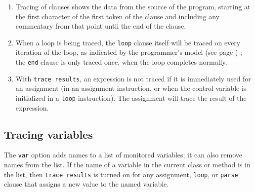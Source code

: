 \begin{enumerate}
\item Tracing of clauses shows the data from the source of the program,
starting at the first character of the first token of the clause and
including any commentary from that point until the end of the clause.
\item When a loop is being traced, the \texttt{loop} clause itself will be
traced on every iteration of the loop, as indicated by the
 programmer's model (see page \pageref{refloopmod}) ; the \texttt{end} clause is only
traced once, when the loop completes normally.
\item With \texttt{trace results}, an expression is not traced if it is
immediately used for an assignment (in an assignment instruction, or
when the control variable is initialized in a \texttt{loop}
instruction).
The assignment will trace the result of the expression.
\end{enumerate}
\subsection{Tracing variables}
 
The \texttt{var} option adds names to a list of monitored
variables; it can also remove names from the list.  If the name of a
variable in the current class or method is in the list, then \texttt{trace
results} is turned on for any assignment, \texttt{loop}, or
\texttt{parse} clause that assigns a new value to the named
variable.
 
